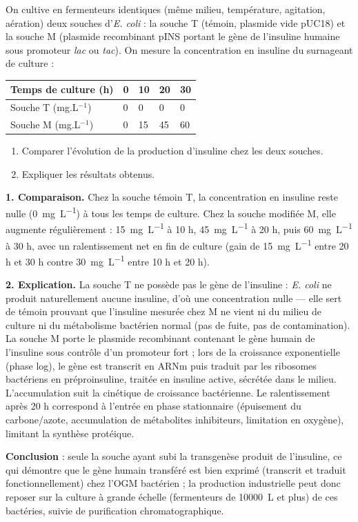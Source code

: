\documentclass[11pt]{article}
\newcommand{\cle}[1]{{\popxbold\color{popdark}#1}}
\begin{document}
\begin{exoresolu}
On cultive en fermenteurs identiques (même milieu, température, agitation, aération) deux souches d'\emph{E. coli} : la souche T (témoin, plasmide vide pUC18) et la souche M (plasmide recombinant pINS portant le gène de l'insuline humaine sous promoteur \emph{lac} ou \emph{tac}). On mesure la concentration en insuline du surnageant de culture :

\begin{center}
\begin{tabularx}{\linewidth}{|l|X|X|X|X|}
\hline
\rowcolor{popblueL} Temps de culture (h) & 0 & 10 & 20 & 30 \\
\hline
Souche T (mg.L$^{-1}$) & 0 & 0 & 0 & 0 \\
\hline
Souche M (mg.L$^{-1}$) & 0 & 15 & 45 & 60 \\
\hline
\end{tabularx}
\end{center}

\begin{enumerate}
\item Comparer l'évolution de la production d'insuline chez les deux souches.
\item Expliquer les résultats obtenus.
\end{enumerate}
\tcblower
\textbf{1. Comparaison.} Chez la souche témoin T, la concentration en insuline reste nulle (\SI{0}{mg.L^{-1}}) à tous les temps de culture. Chez la souche modifiée M, elle augmente régulièrement : \SI{15}{mg.L^{-1}} à 10 h, \SI{45}{mg.L^{-1}} à 20 h, puis \SI{60}{mg.L^{-1}} à 30 h, avec un ralentissement net en fin de culture (gain de \SI{15}{mg.L^{-1}} entre 20 h et 30 h contre \SI{30}{mg.L^{-1}} entre 10 h et 20 h).

\textbf{2. Explication.} La souche T ne possède pas le gène de l'insuline : \emph{E. coli} ne produit naturellement aucune insuline, d'où une concentration nulle — elle sert de \cle{témoin} prouvant que l'insuline mesurée chez M ne vient ni du milieu de culture ni du métabolisme bactérien normal (pas de fuite, pas de contamination). La souche M porte le \cle{plasmide recombinant} contenant le gène humain de l'insuline sous contrôle d'un promoteur fort ; lors de la croissance exponentielle (phase log), le gène est transcrit en ARNm puis traduit par les ribosomes bactériens en préproinsuline, traitée en insuline active, sécrétée dans le milieu. L'accumulation suit la cinétique de croissance bactérienne. Le ralentissement après 20 h correspond à l'entrée en phase stationnaire (épuisement du carbone/azote, accumulation de métabolites inhibiteurs, limitation en oxygène), limitant la synthèse protéique.

\textbf{Conclusion} : seule la souche ayant subi la transgenèse produit de l'insuline, ce qui démontre que le gène humain transféré est bien \cle{exprimé} (transcrit et traduit fonctionnellement) chez l'OGM bactérien ; la production industrielle peut donc reposer sur la culture à grande échelle (fermenteurs de \SI{10000}{L} et plus) de ces bactéries, suivie de purification chromatographique.
\end{exoresolu}
\end{document}
